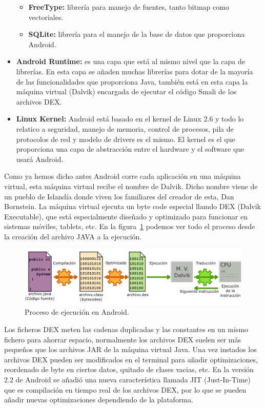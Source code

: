 \begin{itemize}
\begin{itemize}
	\item \textbf{FreeType:} librería para manejo de fuentes, tanto bitmap como vectoriales.

	\item \textbf{SQLite:} librería para el manejo de la base de datos que proporciona Android.

\end{itemize}

\item \textbf{Android Runtime:} es una capa que está al mismo nivel que la capa de librerías. En esta capa se añaden muchas librerías para dotar de la mayoría de las funcionalidades que proporciona Java, también está en esta capa la máquina virtual (Dalvik) encargada de ejecutar el código Smali de los archivos DEX.

\item \textbf{Linux Kernel:} Android está basado en el kernel de Linux 2.6 y todo lo relatico a seguridad, manejo de memoria, control de procesos, pila de protocolos de red y modelo de drivers es el mismo. El kernel es el que proporciona una capa de abstracción entre el hardware y el software que usará Android.

\end{itemize}

Como ya hemos dicho antes Android corre cada aplicación en una máquina virtual, esta máquina virtual recibe el nombre de Dalvik. Dicho nombre viene de un pueblo de Islandía donde viven los familiares del creador de esta, Dan Bornstein. La máquina virtual ejecuta un byte code especial llamdo DEX (Dalvik Executable), que está especialmente diseñado y optimizado para funcionar en sistemas móviles, tablets, etc. En la figura~\ref{fig:maquinaVirtualDalvik} podemos ver todo el proceso desde la creación del archivo JAVA a la ejecución.

\begin{figure}[h]
  \centering
    \includegraphics[scale=0.8]{./Android/imagenes/maquinaVirtualDalvik.png}
  \caption{Proceso de ejecución en Android.}
  \label{fig:maquinaVirtualDalvik}
\end{figure}


Los ficheros DEX meten las cadenas duplicadas y las constantes en un mismo fichero para ahorrar espacio, normalmente los archivos DEX suelen ser más pequeños que los archivos JAR de la máquina virtual Java. Una vez instados los archivos DEX pueden ser modificados en el terminal para añadir optimizaciones, reordenado de byte en ciertos datos, quitado de clases vacias, etc. En la versión 2.2 de Android se añadió una nueva característica llamada JIT (Just-In-Time) que es compilación en tiempo real de los archivos DEX, por lo que se pueden añadir nuevas optimizaciones dependiendo de la plataforma.

